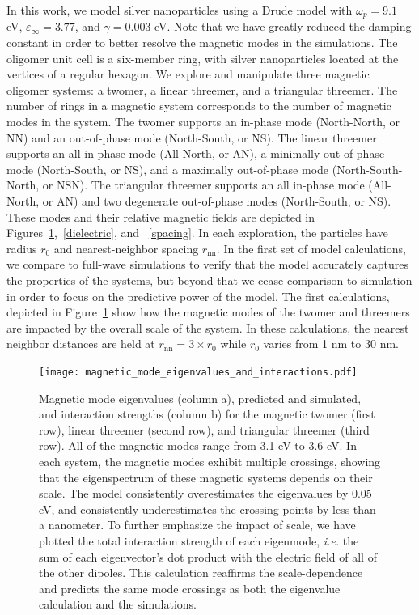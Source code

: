 \documentclass[journal=apchd5,manuscript=article]{achemso}
\begin{document}
In this work, we model silver nanoparticles using a Drude model with $\omega_p = 9.1$ eV, $\varepsilon_{\infty} = 3.77$, and $\gamma = 0.003$ eV. Note that we have greatly reduced the damping constant in order to better resolve the magnetic modes in the simulations. The oligomer unit cell is a six-member ring, with silver nanoparticles located at the vertices of a regular hexagon. We explore and manipulate three magnetic oligomer systems: a twomer, a linear threemer, and a triangular threemer. The number of rings in a magnetic system corresponds to the number of magnetic modes in the system\cite{Cherqui2014}. The twomer supports an in-phase mode (North-North, or NN) and an out-of-phase mode (North-South, or NS). The linear threemer supports an all in-phase mode (All-North, or AN), a minimally out-of-phase mode (North-South, or NS), and a maximally out-of-phase mode (North-South-North, or NSN). The triangular threemer supports an all in-phase mode (All-North, or AN) and two degenerate out-of-phase modes (North-South, or NS). These modes and their relative magnetic fields are depicted in Figures~\ref{magmodes},~\ref{dielectric}, and ~\ref{spacing}. In each exploration, the particles have radius $r_0$ and nearest-neighbor spacing $r_{\textrm{nn}}$. In the first set of model calculations, we compare to full-wave simulations to verify that the model accurately captures the properties of the systems, but beyond that we cease comparison to simulation in order to focus on the predictive power of the model. The first calculations, depicted in Figure~\ref{magmodes} show how the magnetic modes of the twomer and threemers are impacted by the overall scale of the system. In these calculations, the nearest neighbor distances are held at $r_{\textrm{nn}} = 3 \times r_0$ while $r_0$ varies from 1 nm to 30 nm.

\begin{figure}
\centering
\texttt{[image: magnetic\_mode\_eigenvalues\_and\_interactions.pdf]}
\caption{Magnetic mode eigenvalues (column a), predicted and simulated, and interaction strengths (column b) for the magnetic twomer (first row), linear threemer (second row), and triangular threemer (third row). All of the magnetic modes range from 3.1 eV to 3.6 eV. In each system, the magnetic modes exhibit multiple crossings, showing that the eigenspectrum of these magnetic systems depends on their scale. The model consistently overestimates the eigenvalues by 0.05 eV, and consistently underestimates the crossing points by less than a nanometer. To further emphasize the impact of scale, we have plotted the total interaction strength of each eigenmode, \textit{i.e.} the sum of each eigenvector's dot product with the electric field of all of the other dipoles. This calculation reaffirms the scale-dependence and predicts the same mode crossings as both the eigenvalue calculation and the simulations.}
\label{magmodes}
\end{figure}
\end{document}
